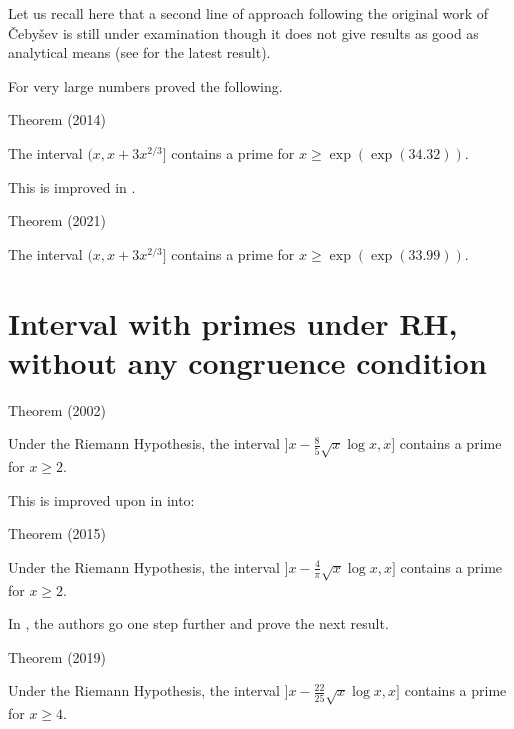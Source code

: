 

\par 

Let us recall here that a second line of approach following the original
work of \v Ceby\v sev is still under examination though it does not give
results as good
as analytical means (see
\cite{CostaPereira*89}
for the latest result).

\par 

For very large numbers
\cite{Dudek*16b}
proved the following.
\begin{thm}{Theorem (2014)}

The interval $(x,x+3 x^{2/3}]$ contains a prime for $x\ge \exp(\exp(34.32))$.
\end{thm}



This is improved in 
\cite{Cully*21}.

\begin{thm}{Theorem (2021)}

The interval $(x,x+3 x^{2/3}]$ contains a prime for $x\ge \exp(\exp(33.99))$.
\end{thm}



\section{Interval with primes under RH, without any congruence condition}



\begin{thm}{Theorem (2002)}

Under the Riemann Hypothesis, the interval $\bigl]x-\tfrac85\sqrt{x}\log x,x\bigr]$
contains a prime for $x\ge2$.
\end{thm}

This is improved upon
in 
\cite{Dudek*15} 
into:
\begin{thm}{Theorem (2015)}

Under the Riemann Hypothesis, the interval $\bigl]x-\tfrac4{\pi}\sqrt{x}\log x,x\bigr]$
contains a prime for $x\ge2$.
\end{thm}


In \cite{Carneiro-Milinovich-Soundararajan*19}, the authors go one step further and prove the next result.
\begin{thm}{Theorem (2019)}

Under the Riemann Hypothesis, the interval $\bigl]x-\tfrac{22}{25}\sqrt{x}\log x,x\bigr]$
contains a prime for $x\ge4$.
\end{thm}



